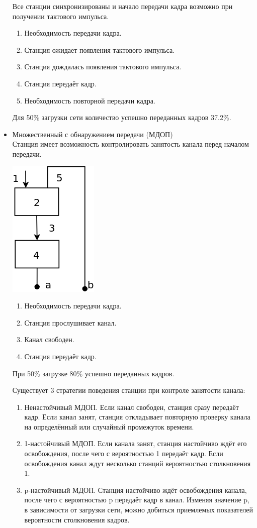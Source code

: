 \documentclass[12pt, russian, oneside, article]{ncc}
\begin{document}
\begin{itemize}
Все станции синхронизированы и начало передачи кадра возможно при получении тактового импульса.

\begin{enumerate}
\item Необходимость передачи кадра.
\item Станция ожидает появления тактового импульса.
\item Станция дождалась появления тактового импульса.
\item Станция передаёт кадр.
\item Необходимость повторной передачи кадра.
\end{enumerate}

Для 50\% загрузки сети количество успешно переданных кадров 37.2\%.


\item Множественный с обнаружением передачи (МДОП)\\
\label{sec-5_1_1_3}%
Станция имеет возможность контролировать занятость канала перед началом передачи.

\includegraphics[]{images/SiSPI/sincaloha.png}

\begin{enumerate}
\item Необходимость передачи кадра.
\item Станция прослушивает канал.
\item Канал свободен.
\item Станция передаёт кадр.
\end{enumerate}

При 50\% загрузке 80\% успешно переданных кадров.

Существует 3 стратегии поведения станции при контроле занятости канала:
\begin{enumerate}
\item Ненастойчивый МДОП. Если канал свободен, станция сразу передаёт кадр. Если канал занят, станция откладывает повторную проверку канала на определённый или случайный промежуток времени.
\item 1-настойчивый МДОП. Если канала занят, станция настойчиво ждёт его освобождения, после чего с вероятностью 1 передаёт кадр. Если освобождения канал ждут несколько станций вероятностью столкновения 1.
\item p-настойчивый МДОП. Станция настойчиво ждёт освобождения канала, после чего с вероятностью p передаёт кадр в канал. Изменяя значение p, в зависимости от загрузки сети, можно добиться приемлемых показателей вероятности столкновения кадров.
\end{enumerate}



\end{itemize}
\end{document}
